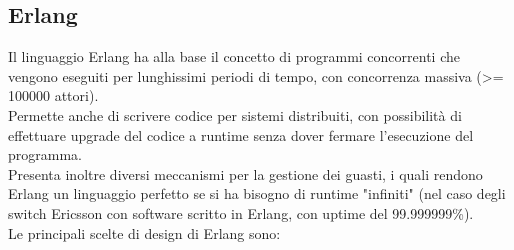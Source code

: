 \documentclass{article}
\begin{document}
\subsection*{Erlang}
Il linguaggio Erlang ha alla base il concetto di programmi concorrenti che vengono eseguiti per lunghissimi periodi di tempo, con concorrenza massiva (>= 100000 attori).\\
Permette anche di scrivere codice per sistemi distribuiti, con possibilità di effettuare upgrade del codice a runtime senza dover fermare l'esecuzione del programma.\\
Presenta inoltre diversi meccanismi per la gestione dei guasti, i quali rendono Erlang un linguaggio perfetto se si ha bisogno di runtime "infiniti" (nel caso degli switch Ericsson con software scritto in Erlang, con uptime del 99.999999\%).\vspace{14pt}\\
Le principali scelte di design di Erlang sono:
\end{document}
